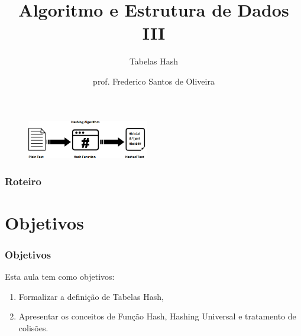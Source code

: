 \documentclass[aspectratio=169]{beamer}
\title[Tabelas Hash]{Algoritmo e Estrutura de Dados III}
\subtitle{Tabelas Hash}
\author[Frederico Santos de Oliveira]{prof. Frederico Santos de Oliveira}
\institute[UFMT]{Universidade Federal de Mato Grosso\\ Instituto de Engenharia}
\date{}
\begin{document}
\begin{frame}
\titlepage %

\begin{figure}[!h]
  \centering
  \includegraphics[width=150pt]{imagens/introducao.png}
  \label{fig_introducao}
\end{figure}
\end{frame}


\begin{frame}
\frametitle{Roteiro} %
\tableofcontents %
\end{frame}


\section{Objetivos}

\begin{frame}
\frametitle{Objetivos}

Esta aula tem como objetivos:

\begin{enumerate}
\item Formalizar a definição de Tabelas Hash,
\item Apresentar os conceitos de Função Hash, Hashing Universal e tratamento de colisões. 
\end{enumerate}
\end{frame}
\end{document}
